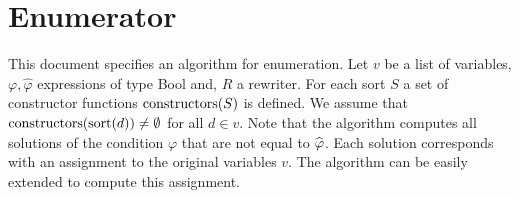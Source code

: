 \documentclass{article}
\begin{document}
\section{Enumerator}

This document specifies an algorithm for enumeration. Let $v$ be a list of
variables, $\varphi ,\widehat{\varphi }$ expressions of type Bool and, $R$ a
rewriter. For each sort $S$ a set of constructor functions $\mathrm{%
constructors}(S)$ is defined. We assume that $\mathrm{constructors}(\mathrm{%
sort}(d))\neq \emptyset $ for all $d\in v$. Note that the algorithm computes
all solutions of the condition $\varphi $ that are not equal to $\widehat{%
\varphi }$. Each solution corresponds with an assignment to the original
variables $v$. The algorithm can be easily extended to compute this
assignment.
\end{document}

